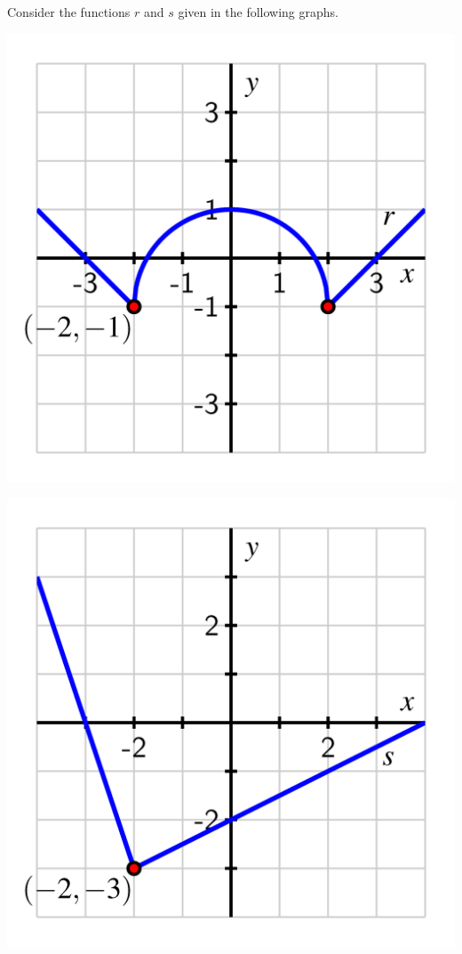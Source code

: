 \documentclass[handout, noauthor, nooutcomes]{ximera}
\begin{document}
\begin{exploration} %

Consider the functions \(r\) and \(s\) given in the following graphs.%
\begin{image}
\includegraphics[width=1\linewidth]{images/transformations-act-r-translation.png}

\includegraphics[width=1\linewidth]{images/transformations-act-s-translation.png}
\end{image}


\end{exploration}
\end{document}
